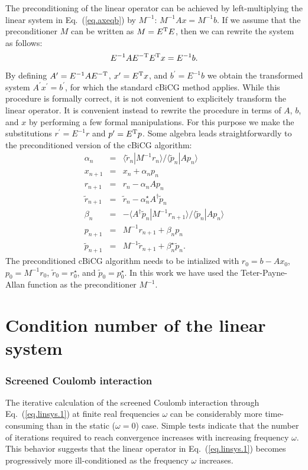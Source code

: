 \documentclass[twocolumn,prb,showpacs,superscriptaddress]{revtex4}
\def\w{\omega}
\def\>{\rangle}
\def\<{\langle}
\def\rt{\tilde{r}}
\def\pt{\tilde{p}}
\begin{document}
The preconditioning of the linear operator can be achieved by left-multiplying the linear system 
in Eq.\ (\ref{eq.axeqb}) 
by $M^{-1}$: $M^{-1}Ax=M^{-1}b$. If we assume that the preconditioner $M$ can be 
written as $M=E^{\rm T}E$, then we can rewrite the system as follows:
  \begin{equation}
  E^{-1}AE^{-{\rm T}} E^{\rm T}x = E^{-1}b.
  \end{equation}
By defining $A^\prime=E^{-1}AE^{-{\rm T}}$, $x^\prime=E^{\rm T}x$, and $b^\prime=E^{-1}b$
we obtain the transformed system $A^\prime x^\prime=b^\prime$, for which the
standard cBiCG method applies.
While this procedure is formally correct, it is not convenient to explicitely
transform the linear operator.
It is convenient instead to rewrite the procedure in terms of
$A$, $b$, and $x$ by performing a few formal manipulations.
For this purpose we make the substitutions
$r^\prime = E^{-1}r$ and $p^\prime=E^{\rm T} p$. Some algebra leads straightforwardly
to the preconditioned version of the cBiCG algorithm:
  \begin{eqnarray}
  \alpha_n & = & \<\rt_n|M^{-1}r_n\>/\<\pt_n|Ap_n\>  \\
  x_{n+1} & = & x_n + \alpha_n p_n \\ 
  r_{n+1} & = & r_n - \alpha_n Ap_n \\ 
  \rt_{n+1} & = & \rt_n - \alpha_n^\star A^\dagger \pt_n \\ 
  \beta_n & = & - \<A^\dagger\pt_n|M^{-1}r_{n+1}\>/\<\pt_n|Ap_n\> \\ 
  p_{n+1} & = & M^{-1}r_{n+1} + \beta_n p_n \\ 
  \pt_{n+1} & = & M^{-1}\rt_{n+1} + \beta_n^\star \pt_n.
  \end{eqnarray}
The preconditioned  cBiCG algorithm needs to be intialized with
$r_0=b-Ax_0$, $p_0=M^{-1}r_0$, $\rt_0=r_0^\star$, and $\pt_0=p_0^\star$.
In this work we have used the Teter-Payne-Allan function as the preconditioner 
$M^{-1}$.\cite{tpa}

\section{Condition number of the linear system}\label{app.condition}

\subsubsection{Screened Coulomb interaction}

The iterative calculation of the screened Coulomb interaction through 
Eq.\ (\ref{eq.linsys.1}) at finite real
frequencies $\w$ can be considerably more time-consuming than in the static
($\w\!=\!0$) case. Simple tests indicate that 
the number of iterations required to reach convergence increases with 
increasing frequency $\w$. This behavior suggests that the linear operator in
Eq.\ (\ref{eq.linsys.1}) becomes progressively more ill-conditioned 
as the frequency $\w$ increases.
\end{document}
